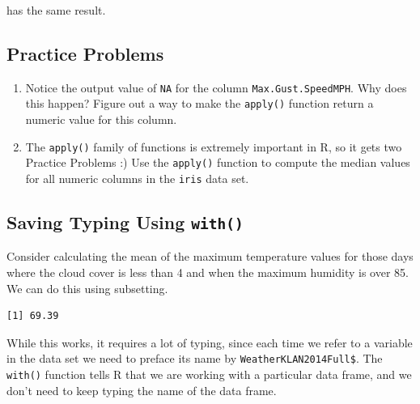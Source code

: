 \documentclass[
]{krantz}
\makeatletter
\newenvironment{Shaded}{\begin{snugshade}}{\end{snugshade}}
\newcommand{\DecValTok}[1]{\textcolor[rgb]{0.06,0.06,0.06}{#1}}
\newcommand{\KeywordTok}[1]{\textcolor[rgb]{0.27,0.27,0.27}{\textbf{#1}}}
\newcommand{\NormalTok}[1]{#1}
\newcommand{\OperatorTok}[1]{\textcolor[rgb]{0.43,0.43,0.43}{\textbf{#1}}}
\newcommand{\StringTok}[1]{\textcolor[rgb]{0.5,0.5,0.5}{#1}}
\providecommand{\tightlist}{%
  \setlength{\itemsep}{0pt}\setlength{\parskip}{0pt}}
\newenvironment{kframe}{%
\medskip{}
\setlength{\fboxsep}{.8em}
 \def\at@end@of@kframe{}%
 \ifinner\ifhmode%
  \def\at@end@of@kframe{\end{minipage}}%
  \begin{minipage}{\columnwidth}%
 \fi\fi%
 \def\FrameCommand##1{\hskip\@totalleftmargin \hskip-\fboxsep
 \colorbox{shadecolor}{##1}\hskip-\fboxsep
     \hskip-\linewidth \hskip-\@totalleftmargin \hskip\columnwidth}%
 \MakeFramed {\advance\hsize-\width
   \@totalleftmargin\z@ \linewidth\hsize
   \@setminipage}}%
 {\par\unskip\endMakeFramed%
 \at@end@of@kframe}
\renewenvironment{Shaded}{\begin{kframe}}{\end{kframe}}
\makeatother
\begin{document}
has the same result.

\hypertarget{ch6PP1}{%
\subsection{Practice Problems}\label{ch6PP1}}

\begin{enumerate}
\def\labelenumi{\alph{enumi}.}
\tightlist
\item
  Notice the output value of \texttt{NA} for the column \texttt{Max.Gust.SpeedMPH}. Why does this happen? Figure out a way to make the \texttt{apply()} function return a numeric value for this column.
\item
  The \texttt{apply()} family of functions is extremely important in R, so it gets two Practice Problems :) Use the \texttt{apply()} function to compute the median values for all numeric columns in the \texttt{iris} data set.
\end{enumerate}

\hypertarget{saving-typing-using-with}{%
\subsection{\texorpdfstring{Saving Typing Using \texttt{with()}}{Saving Typing Using with()}}\label{saving-typing-using-with}}

Consider calculating the mean of the maximum temperature values for those days where the cloud cover is less than 4 and when the maximum humidity is over 85. We can do this using subsetting.

\begin{Shaded}
\end{Shaded}

\begin{verbatim}
[1] 69.39
\end{verbatim}

While this works, it requires a lot of typing, since each time we refer to a variable in the data set we need to preface its name by \texttt{WeatherKLAN2014Full\$}. The \texttt{with()} function tells R that we are working with a particular data frame, and we don't need to keep typing the name of the data frame.
\end{document}

